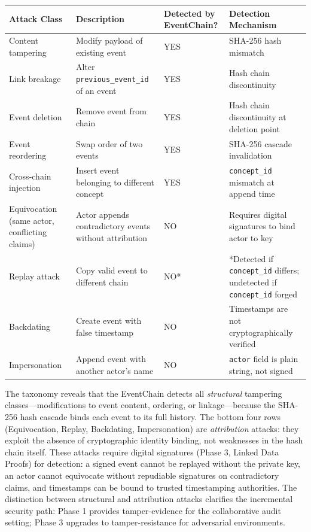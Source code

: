 \begin{longtable}[]{@{}>{\raggedright\arraybackslash}p{}
  >{\raggedright\arraybackslash}p{}
  >{\raggedright\arraybackslash}p{}
  >{\raggedright\arraybackslash}p{}@{}}
\toprule
Attack Class
& Description
& Detected by EventChain?
& Detection Mechanism
\\
\midrule
\endhead
\bottomrule
\endlastfoot
Content tampering & Modify payload of existing event & YES & SHA-256 hash mismatch \\
Link breakage & Alter \texttt{previous\_event\_id} of an event & YES & Hash chain discontinuity \\
Event deletion & Remove event from chain & YES & Hash chain discontinuity at deletion point \\
Event reordering & Swap order of two events & YES & SHA-256 cascade invalidation \\
Cross-chain injection & Insert event belonging to different concept & YES & \texttt{concept\_id} mismatch at append time \\
Equivocation (same actor, conflicting claims) & Actor appends contradictory events without attribution & NO & Requires digital signatures to bind actor to key \\
Replay attack & Copy valid event to different chain & NO* & *Detected if \texttt{concept\_id} differs; undetected if \texttt{concept\_id} forged \\
Backdating & Create event with false timestamp & NO & Timestamps are not cryptographically verified \\
Impersonation & Append event with another actor's name & NO & \texttt{actor} field is plain string, not signed \\
\end{longtable}

The taxonomy reveals that the EventChain detects all \emph{structural} tampering classes---modifications to event content, ordering, or linkage---because the SHA-256 hash cascade binds each event to its full history. The bottom four rows (Equivocation, Replay, Backdating, Impersonation) are \emph{attribution} attacks: they exploit the absence of cryptographic identity binding, not weaknesses in the hash chain itself. These attacks require digital signatures (Phase 3, Linked Data Proofs) for detection: a signed event cannot be replayed without the private key, an actor cannot equivocate without repudiable signatures on contradictory claims, and timestamps can be bound to trusted timestamping authorities. The distinction between structural and attribution attacks clarifies the incremental security path: Phase 1 provides tamper-evidence for the collaborative audit setting; Phase 3 upgrades to tamper-resistance for adversarial environments.

